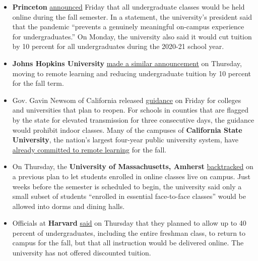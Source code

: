 \begin{itemize}
\item
  \textbf{Princeton}
  \href{https://www.princeton.edu/news/2020/08/07/fall-2020-update-undergraduate-education-be-fully-remote}{announced}
  Friday that all undergraduate classes would be held online during the
  fall semester. In a statement, the university's president said that
  the pandemic ``prevents a genuinely meaningful on-campus experience
  for undergraduates.'' On Monday, the university also said it would cut
  tuition by 10 percent for all undergraduates during the 2020-21 school
  year.
\item
  \textbf{Johns Hopkins University}
  \href{https://hub.jhu.edu/2020/08/06/university-moves-undergraduate-instruction-online/}{made
  a similar announcement} on Thursday, moving to remote learning and
  reducing undergraduate tuition by 10 percent for the fall term.
\item
  Gov. Gavin Newsom of California released
  \href{https://files.covid19.ca.gov/pdf/guidance-higher-education--en.pdf}{guidance}
  on Friday for colleges and universities that plan to reopen. For
  schools in counties that are flagged by the state for elevated
  transmission for three consecutive days, the guidance would prohibit
  indoor classes. Many of the campuses of \textbf{California State
  University}, the nation's largest four-year public university system,
  have
  \href{https://www.nytimes.com/2020/05/12/us/cal-state-online-classes.html}{already
  committed to remote learning} for the fall.
\item
  On Thursday, the \textbf{University of Massachusetts, Amherst}
  \href{https://www.umass.edu/coronavirus/news/significant-changes-our-fall-reopening-plan}{backtracked}
  on a previous plan to let students enrolled in online classes live on
  campus. Just weeks before the semester is scheduled to begin, the
  university said only a small subset of students ``enrolled in
  essential face-to-face classes'' would be allowed into dorms and
  dining halls.
\item
  Officials at \textbf{Harvard}
  \href{https://www.fas.harvard.edu/fas-decision-2020-2021-academic-year}{said}
  on Thursday that they planned to allow up to 40 percent of
  undergraduates, including the entire freshman class, to return to
  campus for the fall, but that all instruction would be delivered
  online. The university has not offered discounted tuition.
\end{itemize}

\hypertarget{section-4}{%
\subsection{}\label{section-4}}

